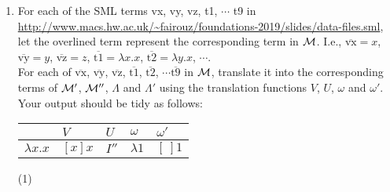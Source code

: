 \documentclass[11pt]{article}
\newcommand \cM {\cal M}
\begin{document}
\begin{enumerate}
\begin{itemize}
	      	      We define $\omega': {\cal M}' \mapsto \Lambda'$ by:
	      	      $\omega'(A) = \omega'_{[v_1,\cdots, v_n]}(A)$ where 
	      	      $FV(A) \subseteq \{v_1,\cdots,v_n\}$.\\
	      	      So for example, if our variables are ordered as $x,y,z,x',y',z', \cdots$ then\\ $\omega'([x][y][x']\langle x'\rangle \langle z \rangle x)
	      	      = \omega'_{[x,y,z]}([x][y][x']\langle x'\rangle \langle z \rangle x) = []\omega_{[x,x,y,z]}([y][x']\langle x'\rangle \langle z \rangle x) = [][]\omega_{[y,x,x,y,z]}([x']\langle x'\rangle \langle z \rangle x) = [][][]\omega_{[x',y,x,x,y,z]}(\langle x'\rangle \langle z \rangle x) = [][][] \langle 1\rangle \langle 6 \rangle 3$.
	      	      
	      	     
	      	      
	      \end{itemize}
	      \color{black}
	\item
	      For each of the SML terms vx, vy, vz, t1, $\cdots$ t9 in \url{http://www.macs.hw.ac.uk/~fairouz/foundations-2019/slides/data-files.sml}, let the overlined term represent the corresponding term in $\cM$.  I.e., $\overline{\mbox{vx}} = x$, $\overline{\mbox{vy}} = y$, $\overline{\mbox{vz}} = z$, $\overline{\mbox{t1}} = \lambda x.x$, $\overline{\mbox{t2}}
	      = \lambda y.x$, $\cdots$.\\
	      For each of $\overline{\mbox{vx}}$, $\overline{\mbox{vy}}$, $\overline{\mbox{vz}}$, $\overline{\mbox{t1}}$,
	      $\overline{\mbox{t2}}$, $\cdots \overline{\mbox{t9}}$ in $\cM$, translate it into the corresponding terms of $\cM'$, $\cM''$, $\Lambda$ and  $\Lambda'$ using the translation functions $V$, $U$, $\omega$ and $\omega'$.  \\
	      Your output should be tidy as follows:
	      
	      \begin{tabular}{|l|l|l|l|l|}
	      	\hline
	      	              & $V$    & $U$   & $\omega$    & $\omega'$ \\
	      	\hline
	      	$\lambda x.x$ & $[x]x$ & $I''$ & $\lambda 1$ & $[\:]1$   \\
	      	\hline
	      \end{tabular}
	            
	      \hfill{(1)} %
	      

\end{enumerate}
\end{document}

